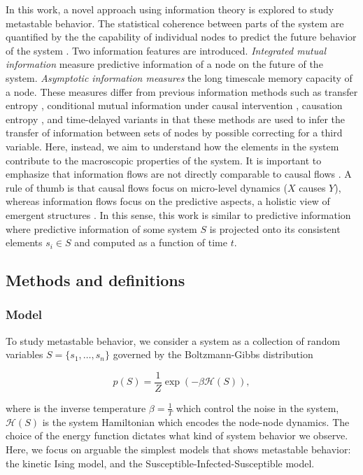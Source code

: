 \documentclass[a4paper, 11pt, twocolumn]{article}
\begin{document}
In this work,  a novel approach using  information theory is
explored  to  study  metastable  behavior.  The  statistical
coherence between parts of the  system are quantified by the
the  capability of  individual nodes  to predict  the future
behavior  of  the  system \cite{Lizier2013}.  Two  information
features  are  introduced. \emph{Integrated  mutual  information}
measure predictive  information of a  node on the  future of
the  system.  \emph{Asymptotic  information  measures}  the  long
timescale memory  capacity of a node.  These measures differ
from previous  information methods such as  transfer entropy
\cite{Schreiber}, conditional mutual  information under causal
intervention \cite{Ay2008},  causation entropy \cite{Runge2019},
and time-delayed variants \cite{Li2008}  in that these methods
are used to  infer the transfer of  information between sets
of nodes by possible correcting  for a third variable. Here,
instead, we aim to understand how the elements in the system
contribute to  the macroscopic properties of  the system. It
is  important to  emphasize that  information flows  are not
directly comparable  to causal flows \cite{James2016}.  A rule
of thumb is that causal  flows focus on micro-level dynamics
(\(X\) causes \(Y\)), whereas information flows focus on the
predictive aspects,  a holistic view of  emergent structures
\cite{Lizier2013}.  In this  sense,  this work  is similar  to
predictive  information   \cite{Bialek1999}  where  predictive
information  of  some system  \(S\)  is  projected onto  its
consistent elements \(s_i  \in S\) and computed  as a function
of time \(t\).

\subsection{Methods and definitions}
\label{sec:org644ca66}
\subsubsection{Model}
\label{sec:org5382bb5}
To  study metastable  behavior, we  consider a  system as  a
collection of  random variables \(S =  \{s_1, \dots, s_n\}\)
governed by the Boltzmann-Gibbs distribution

\[p(S)    =     \frac{1}{Z}    \exp(- \beta \mathcal{H}(S) ),\]

where is  the inverse temperature \(\beta  = \frac{1}{T}\) which
control the  noise in the system,  \(\mathcal{H}(S)\) is the
system Hamiltonian which encodes the node-node dynamics. The
choice of the  energy function dictates what  kind of system
behavior we observe. Here, we focus on arguable the simplest
models  that shows  metastable behavior:  the kinetic  Ising
model, and the Susceptible-Infected-Susceptible model.
\end{document}
